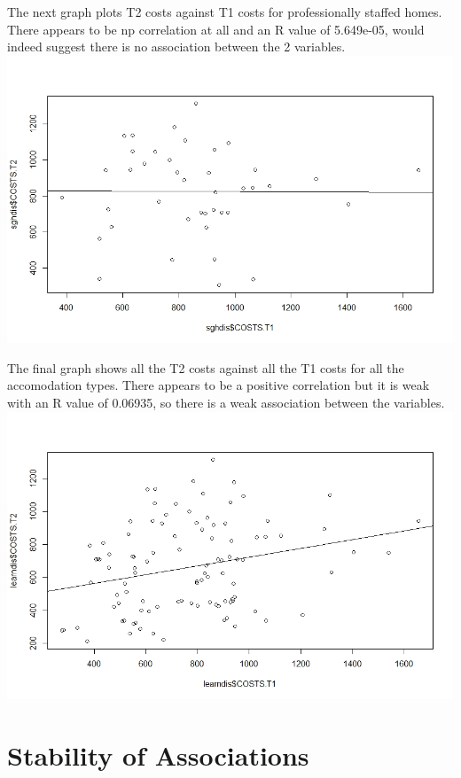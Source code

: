 \documentclass[]{article}
\begin{document}
The next graph plots T2 costs against T1 costs for professionally staffed homes. There appears to be np correlation at all and an R value of 5.649e-05, would indeed suggest there is no association between the 2 variables.
\centering
\includegraphics[width=\textwidth]{RStudio/jpeg/Reg_SGH.jpeg}
\raggedright

The final graph shows all the T2 costs against all the T1 costs for all the accomodation types. There appears to be a positive correlation but it is weak with an R value of 0.06935, so there is a weak association between the variables.
\centering
\includegraphics[width=\textwidth]{RStudio/jpeg/Reg_COST.jpeg}
\raggedright


\section{Stability of Associations}
\end{document}
